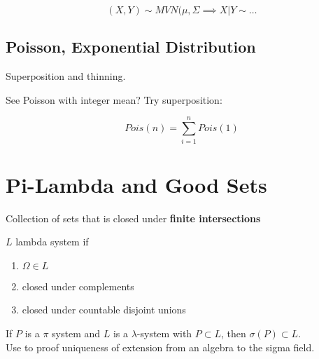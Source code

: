 \documentclass{article}
\begin{document}
\begin{fact}
	$$(X,Y) \sim MVN(\mu, \Sigma \implies X|Y \sim \ldots $$
\end{fact}

\subsection{Poisson, Exponential Distribution}
Superposition and thinning.

\begin{fact}[Superposition]
	See Poisson with integer mean? Try superposition:
	
	$$Pois(n) = \sum_{i=1}^n Pois(1)$$
\end{fact}

\begin{fact}
	
\end{fact}
\begin{fact}
	
\end{fact}




\section{Pi-Lambda and Good Sets}

\begin{definition}[$\pi$-system]
Collection of sets that is closed under \textbf{finite intersections}
\end{definition}
\begin{definition}
$L$ lambda system if
\begin{enumerate}
	\item $\Omega \in L$
	\item closed under complements
	\item closed under countable disjoint unions
\end{enumerate}
\end{definition}

\begin{theorem}
If $P$ is a $\pi$ system and $L$ is a $\lambda$-system with $P\subset L$, then $\sigma(P)\subset L$.\\
Use to proof uniqueness of extension from an algebra to the sigma field.
\end{theorem}
\begin{example}
\end{example}
\end{document}
